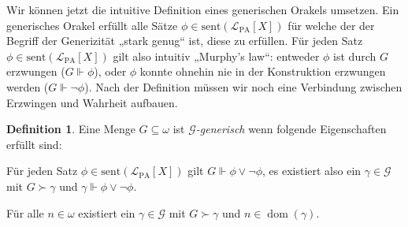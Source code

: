 \documentclass[nofonts]{uebung}
\theoremstyle{definition}
\newtheorem{definition}[theorem]{Definition}
\DeclareMathOperator{\dom}{dom}
\begin{document}
Wir können jetzt die intuitive Definition eines generischen Orakels umsetzen. Ein generisches Orakel erfüllt alle Sätze $\phi\in \mathrm{sent}(\mathcal L_{\mathrm{PA}}[X])$ für welche der der Begriff der Generizität „stark genug“ ist, diese zu erfüllen. Für jeden Satz $\phi\in \mathrm{sent}(\mathcal L_{\mathrm{PA}}[X])$ gilt also intuitiv „Murphy's law“: entweder $\phi$ ist durch $G$ erzwungen ($G\Vdash \phi$), oder $\phi$ konnte ohnehin nie in der Konstruktion erzwungen werden ($G\Vdash \neg\phi$).
Nach der Definition müssen wir noch eine Verbindung zwischen Erzwingen und Wahrheit aufbauen.

\begin{definition}
    Eine Menge $G\subseteq\omega$ ist \emph{$\mathcal G$-generisch} wenn folgende Eigenschaften erfüllt sind:
    \begin{thmenum}
        \item\label{def:genorakel-forcing} Für jeden Satz $\phi\in \mathrm{sent}(\mathcal L_{\mathrm{PA}}[X])$ gilt $G\Vdash \phi\lor\neg\phi$, es existiert also ein $\gamma\in\mathcal G$ mit $G\succ \gamma$ und $\gamma\Vdash \phi\lor\neg\phi$.

        \item\label{def:genorakel-vollst} Für alle $n\in\omega$ existiert ein $\gamma\in\mathcal G$ mit $G\succ\gamma$ und $n\in\dom(\gamma)$.
    \end{thmenum}
\end{definition}
\end{document}
